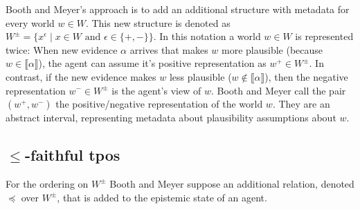 \documentclass[english, 12pt]{scrartcl}
\theoremstyle{definition}
\theoremstyle{definition}
\theoremstyle{definition}
\newcommand{\modelsOf}[1]{\llbracket #1 \rrbracket}
\begin{document}
Booth and Meyer's \cite{Booth2011} approach is to add an additional structure with metadata for every world $w \in W$. This new structure is denoted as $W^{\pm} = \{x^{\epsilon} \mid x \in W \textrm{ and } \epsilon \in \{+, -\}\}$. In this notation a world $w \in W$ is represented twice: When new evidence $\alpha$ arrives that makes $w$ more plausible (because $w \in \modelsOf{\alpha}$), the agent can assume it's positive representation as $w^{+} \in W^{\pm}$. In contrast, if the new evidence makes $w$ less plausible ($w \notin \modelsOf{\alpha}$), then the negative representation $w^{-} \in W^{\pm}$ is the agent's view of $w$. Booth and Meyer call the pair $(w^{+}, w^{-})$ the positive/negative representation of the world $w$. They are an abstract interval, representing metadata about plausibility assumptions about $w$.

\subsection{$\leq$-faithful tpos}
For the ordering on $W^{\pm}$ Booth and Meyer suppose an additional relation, denoted $\preceq$ over $W^{\pm}$, that is added to the epistemic state of an agent.
\end{document}
